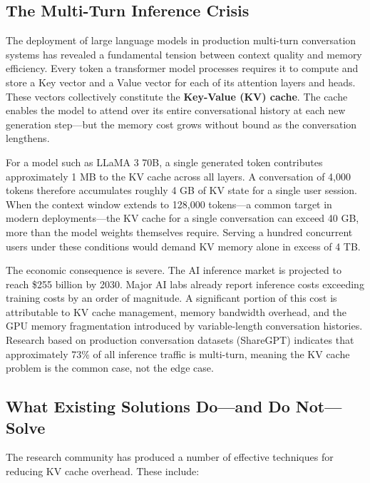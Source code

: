 \documentclass[11pt, a4paper, twoside]{article}
\theoremstyle{definition}
\begin{document}
\subsection{The Multi-Turn Inference Crisis}

The deployment of large language models in production multi-turn conversation systems
has revealed a fundamental tension between context quality and memory efficiency. Every
token a transformer model processes requires it to compute and store a Key vector and
a Value vector for each of its attention layers and heads. These vectors collectively
constitute the \textbf{Key-Value (KV) cache}. The cache enables the model to attend
over its entire conversational history at each new generation step---but the memory
cost grows without bound as the conversation lengthens.

\medskip

For a model such as LLaMA 3 70B, a single generated token contributes approximately
1 MB to the KV cache across all layers. A conversation of 4,000 tokens therefore
accumulates roughly 4 GB of KV state for a single user session. When the context
window extends to 128,000 tokens---a common target in modern deployments---the KV
cache for a single conversation can exceed 40 GB, more than the model weights
themselves require. Serving a hundred concurrent users under these conditions would
demand KV memory alone in excess of 4 TB.

\medskip

The economic consequence is severe. The AI inference market is projected to reach
\$255 billion by 2030. Major AI labs already report inference costs exceeding training
costs by an order of magnitude. A significant portion of this cost is attributable to
KV cache management, memory bandwidth overhead, and the GPU memory fragmentation
introduced by variable-length conversation histories. Research based on production
conversation datasets (ShareGPT) indicates that approximately 73\% of all inference
traffic is multi-turn, meaning the KV cache problem is the common case, not the edge case.

\subsection{What Existing Solutions Do---and Do Not---Solve}

The research community has produced a number of effective techniques for reducing KV
cache overhead. These include:
\end{document}
